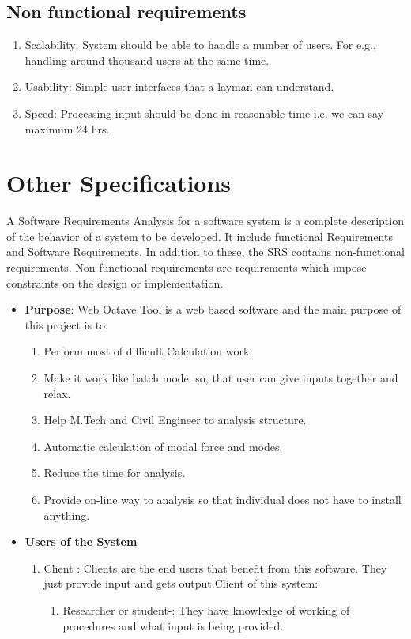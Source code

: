 \begin{itemize}
\begin{enumerate}
\end{enumerate}
\vskip 0.5cm
\subsection{Non functional requirements}
\begin{enumerate} 
\item Scalability: System should be able to handle a number of users. 
For e.g., handling around thousand users at the same time.
\item Usability: Simple user interfaces that a layman can understand.
\item Speed: Processing input should be done in reasonable time
 i.e. we can say maximum 24 hrs.
\end{enumerate}
\end{itemize}


\section{Other Specifications}

A Software Requirements Analysis for a software system is a complete 
description of the behavior of a system to be developed. It include functional Requirements
and Software Requirements. In addition to these, the SRS contains 
non-functional requirements. Non-functional requirements are 
requirements which impose constraints on the design or implementation.
\begin{itemize}
\item{\bf Purpose}: Web Octave Tool is a web based software and the main purpose of this project is to:
\begin{enumerate}
\item Perform most of difficult Calculation work.
\item Make it work like batch mode. so, that user can give inputs 
together and relax.
\item Help M.Tech and Civil Engineer to analysis structure.
\item Automatic calculation of modal force and modes.
\item Reduce the time for analysis.
\item Provide on-line way to analysis so that individual does not have to 
install anything.
\end{enumerate}

\item{\bf Users of the System}
\begin{enumerate} 
\item Client : Clients are the end users that benefit from this software.
They just provide input and gets output.Client of this system:
\begin{enumerate}
\item Researcher or student-: They have knowledge of working of procedures and what input is being provided.  
\end{enumerate}
\end{enumerate}
\end{itemize}


